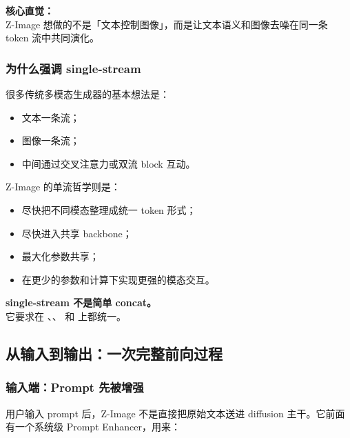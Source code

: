 \begin{summarybox}
\textbf{核心直觉：}\\
Z-Image 想做的不是「文本控制图像」，而是让文本语义和图像去噪在同一条 token 流中共同演化。
\end{summarybox}

\subsubsection{为什么强调 single-stream}

很多传统多模态生成器的基本想法是：

\begin{itemize}[leftmargin=1.5em]
  \item 文本一条流；
  \item 图像一条流；
  \item 中间通过交叉注意力或双流 block 互动。
\end{itemize}

Z-Image 的单流哲学则是：

\begin{itemize}[leftmargin=1.5em]
  \item 尽快把不同模态整理成统一 token 形式；
  \item 尽快进入共享 backbone；
  \item 最大化参数共享；
  \item 在更少的参数和计算下实现更强的模态交互。
\end{itemize}

\begin{conceptbox}
\textbf{single-stream 不是简单 concat。}\\
它要求在 、、 和  上都统一。
\end{conceptbox}

\subsection{从输入到输出：一次完整前向过程}

\subsubsection{输入端：Prompt 先被增强}

用户输入 prompt 后，Z-Image 不是直接把原始文本送进 diffusion 主干。它前面有一个系统级 Prompt Enhancer，用来：

